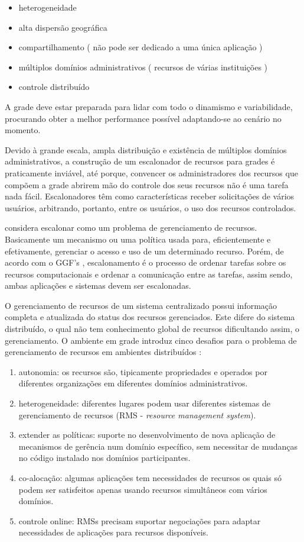 \begin{itemize}
	\item heterogeneidade
	\item alta dispersão geográfica
	\item compartilhamento ( não pode ser dedicado a uma única aplicação )
	\item múltiplos domínios administrativos ( recursos de várias instituições )
	\item controle distribuído 
\end{itemize}

A grade deve estar preparada para lidar com todo o dinamismo e variabilidade, procurando obter a melhor performance possível adaptando-se ao cenário no momento.

Devido à grande escala, ampla distribuição e existência de múltiplos domínios administrativos, a construção de um escalonador de recursos para grades é praticamente inviável, até porque, convencer os administradores dos recursos que compõem a grade abrirem mão do controle dos seus recursos não é uma tarefa nada fácil. Escalonadores têm como características receber solicitações de vários usuários, arbitrando, portanto, entre os usuários, o uso dos recursos controlados.  

\cite{Thomas1996} considera escalonar como um problema de gerenciamento de recursos. Basicamente um mecanismo ou uma política usada para, eficientemente e efetivamente, gerenciar o acesso e uso de um determinado recurso. Porém, de acordo com o GGF's \cite{M.2002}, escalonamento é o processo de ordenar tarefas sobre os recursos computacionais e ordenar a comunicação entre as tarefas, assim sendo, ambas aplicações e sistemas devem ser escalonadas. 

O gerenciamento de recursos de um sistema centralizado possui informação completa e atualizada do status dos recursos gerenciados. Este difere do sistema distribuído, o qual não tem conhecimento global de recursos dificultando assim, o gerenciamento. O ambiente em grade introduz cinco desafios para o problema de gerenciamento de recursos em ambientes distribuídos \cite{Karl1998}:

\begin{enumerate}
\item autonomia: os recursos são, tipicamente propriedades e operados por diferentes organizações em diferentes domínios administrativos.
\item heterogeneidade: diferentes lugares podem usar diferentes sistemas de gerenciamento de recursos (RMS - \emph{resource management system}).
\item extender as políticas: suporte no desenvolvimento de nova aplicação de mecanismos de gerência num domínio específico, sem necessitar de mudanças no código instalado nos domínios participantes.
\item co-alocação: algumas aplicações tem necessidades de recursos os quais só podem ser satisfeitos apenas usando recursos simultâneos com vários domínios.
\item controle online: RMSs precisam suportar negociações para adaptar necessidades de aplicações para recursos disponíveis.
\end{enumerate}

